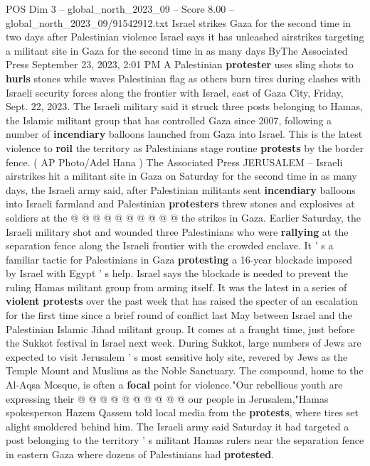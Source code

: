 \begin{textsample}{POS Dim 3 – global\_north\_2023\_09 – Score 8.00 – global\_north\_2023\_09/91542912.txt}  \label{ex:f3_pos_044}
Israel strikes Gaza for the second time in two days after Palestinian violence Israel says it has unleashed airstrikes targeting a militant site in Gaza for the second time in as many days ByThe Associated Press September 23, 2023, 2:01 PM A Palestinian \textbf{protester} uses sling shots to \textbf{hurls} stones while waves Palestinian flag as others burn tires during clashes with Israeli security forces along the frontier with Israel, east of Gaza City, Friday, Sept. 22, 2023.
The Israeli military said it struck three posts belonging to Hamas, the Islamic militant group that has controlled Gaza since 2007, following a number of \textbf{incendiary} balloons launched from Gaza into Israel.
This is the latest violence to \textbf{roil} the territory as Palestinians stage routine \textbf{protests} by the border fence. ( AP Photo/Adel Hana ) The Associated Press JERUSALEM -- Israeli airstrikes hit a militant site in Gaza on Saturday for the second time in as many days, the Israeli army said, after Palestinian militants sent \textbf{incendiary} balloons into Israeli farmland and Palestinian \textbf{protesters} threw stones and explosives at soldiers at the @ @ @ @ @ @ @ @ @ @ the strikes in Gaza.
Earlier Saturday, the Israeli military shot and wounded three Palestinians who were \textbf{rallying} at the separation fence along the Israeli frontier with the crowded enclave.
It ' s a familiar tactic for Palestinians in Gaza \textbf{protesting} a 16-year blockade imposed by Israel with Egypt ' s help.
Israel says the blockade is needed to prevent the ruling Hamas militant group from arming itself.
It was the latest in a series of \textbf{violent} \textbf{protests} over the past week that has raised the specter of an escalation for the first time since a brief round of conflict last May between Israel and the Palestinian Islamic Jihad militant group.
It comes at a fraught time, just before the Sukkot festival in Israel next week.
During Sukkot, large numbers of Jews are expected to visit Jerusalem ' s most sensitive holy site, revered by Jews as the Temple Mount and Muslims as the Noble Sanctuary.
The compound, home to the Al-Aqsa Mosque, is often a \textbf{focal} point for violence."Our rebellious youth are expressing their @ @ @ @ @ @ @ @ @ @ our people in Jerusalem,"Hamas spokesperson Hazem Qassem told local media from the \textbf{protests}, where tires set alight smoldered behind him.
The Israeli army said Saturday it had targeted a post belonging to the territory ' s militant Hamas rulers near the separation fence in eastern Gaza where dozens of Palestinians had \textbf{protested}.

\end{textsample}

